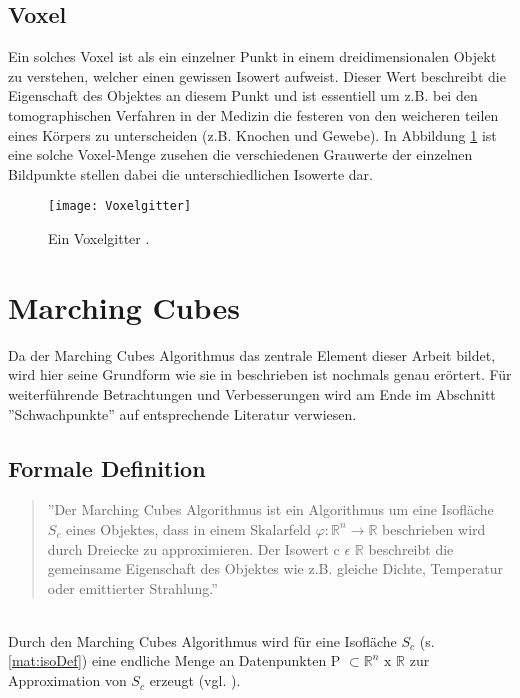 \subsection{Voxel} 
Ein solches Voxel ist als ein einzelner Punkt in einem dreidimensionalen Objekt zu verstehen, welcher einen gewissen Isowert aufweist. Dieser Wert beschreibt die Eigenschaft des Objektes an diesem Punkt und ist essentiell um z.B. bei den tomographischen Verfahren in der Medizin die festeren von den weicheren teilen eines Körpers zu unterscheiden (z.B. Knochen und Gewebe). In Abbildung \ref{fig:Voxelgitter} ist eine solche Voxel-Menge zusehen die verschiedenen Grauwerte der einzelnen Bildpunkte stellen dabei die unterschiedlichen Isowerte dar.

\begin{figure}
	\centering
	\texttt{[image: Voxelgitter]}
	\caption{Ein Voxelgitter \citep{SeibtBak}.}
	\label{fig:Voxelgitter}
\end{figure}

\section{Marching Cubes}
Da der Marching Cubes Algorithmus das zentrale Element dieser Arbeit bildet, wird hier seine Grundform wie sie in \citep{MCAlgo} beschrieben ist nochmals genau erörtert. Für weiterführende Betrachtungen und Verbesserungen wird am Ende im Abschnitt ''Schwachpunkte'' auf entsprechende Literatur verwiesen.
\subsection{Formale Definition}
\begin{quote}
	''Der Marching Cubes Algorithmus ist ein Algorithmus um eine Isofläche $S_{c}$ eines Objektes, dass in einem Skalarfeld  $\varphi : \mathbb{R}^{n} \rightarrow \mathbb{R }$ beschrieben wird durch Dreiecke zu approximieren. Der Isowert c $\epsilon$ $ \mathbb{ R} $ beschreibt die gemeinsame Eigenschaft des Objektes wie z.B. gleiche Dichte, Temperatur oder emittierter Strahlung.''
\end{quote} \citep{WollmannBak}\\

\noindent Durch den Marching Cubes Algorithmus wird für eine Isofläche $S_{c}$ (s. \ref{mat:isoDef})
eine endliche Menge an Datenpunkten P $\subset \mathbb{R}^{n} \text{ x } \mathbb{R}$ zur Approximation von $S_{c}$ erzeugt (vgl. \citep{VisualHandbook}).


